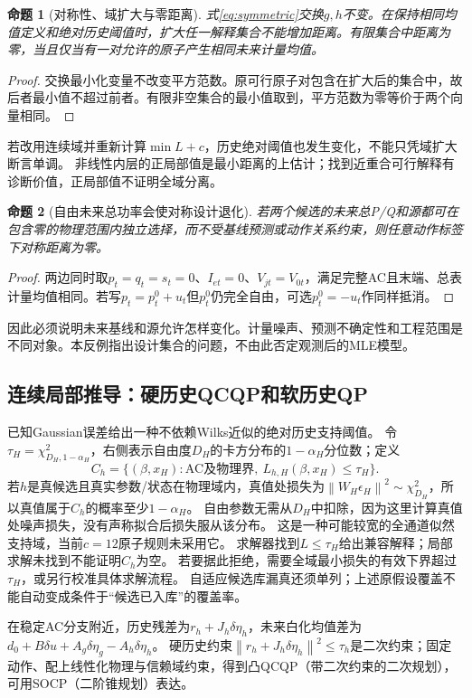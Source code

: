 \documentclass[UTF8,fontset=fandol,11pt,a4paper]{ctexart}
\newtheorem{proposition}{命题}
\newcommand{\norm}[1]{\left\lVert#1\right\rVert}
\begin{document}
\begin{proposition}[对称性、域扩大与零距离]
式\eqref{eq:symmetric}交换$g,h$不变。在保持相同均值定义和绝对历史阈值时，扩大任一解释集合不能增加距离。有限集合中距离为零，当且仅当有一对允许的原子产生相同未来计量均值。
\end{proposition}
\begin{proof}
交换最小化变量不改变平方范数。原可行原子对包含在扩大后的集合中，故后者最小值不超过前者。有限非空集合的最小值取到，平方范数为零等价于两个向量相同。
\end{proof}
若改用连续域并重新计算$\min L+c$，历史绝对阈值也发生变化，不能只凭域扩大断言单调。
非线性内层的正局部值是最小距离的上估计；找到近重合可行解释有诊断价值，正局部值不证明全域分离。

\begin{proposition}[自由未来总功率会使对称设计退化]
若两个候选的未来总P/Q和源都可在包含零的物理范围内独立选择，而不受基线预测或动作关系约束，则任意动作标签下对称距离为零。
\end{proposition}
\begin{proof}
两边同时取$p_t=q_t=s_t=0$、$I_{et}=0$、$V_{jt}=V_{0t}$，满足完整AC且末端、总表计量均值相同。若写$p_t=p_t^0+u_t$但$p_t^0$仍完全自由，可选$p_t^0=-u_t$作同样抵消。
\end{proof}
因此必须说明未来基线和源允许怎样变化。计量噪声、预测不确定性和工程范围是不同对象。本反例指出设计集合的问题，不由此否定观测后的MLE模型。

\subsection{连续局部推导：硬历史QCQP和软历史QP}
已知Gaussian误差给出一种不依赖Wilks近似的绝对历史支持阈值。
令$\tau_H=\chi^2_{D_H,1-\alpha_H}$，右侧表示自由度$D_H$的卡方分布的$1-\alpha_H$分位数；定义
\[
 C_h=\{(\beta,x_H):\text{AC及物理界},\ L_{h,H}(\beta,x_H)\le\tau_H\}.
\]
若$h$是真候选且真实参数/状态在物理域内，真值处损失为$\norm{W_H\epsilon_H}^2\sim\chi^2_{D_H}$，所以真值属于$C_h$的概率至少$1-\alpha_H$。
自由参数无需从$D_H$中扣除，因为这里计算真值处噪声损失，没有声称拟合后损失服从该分布。
这是一种可能较宽的全通道似然支持域，当前$c=12$原子规则未采用它。
求解器找到$L\le\tau_H$给出兼容解释；局部求解未找到不能证明$C_h$为空。
若要据此拒绝，需要全域最小损失的有效下界超过$\tau_H$，或另行校准具体求解流程。
自适应候选库漏真还须单列；上述原假设覆盖不能自动变成条件于“候选已入库”的覆盖率。

在稳定AC分支附近，历史残差为$r_h+J_h\delta\eta_h$，未来白化均值差为$d_0+B\delta u+A_g\delta\eta_g-A_h\delta\eta_h$。
硬历史约束$\norm{r_h+J_h\delta\eta_h}^2\le\tau_h$是二次约束；固定动作、配上线性化物理与信赖域约束，得到凸QCQP（带二次约束的二次规划），可用SOCP（二阶锥规划）表达。
\end{document}
